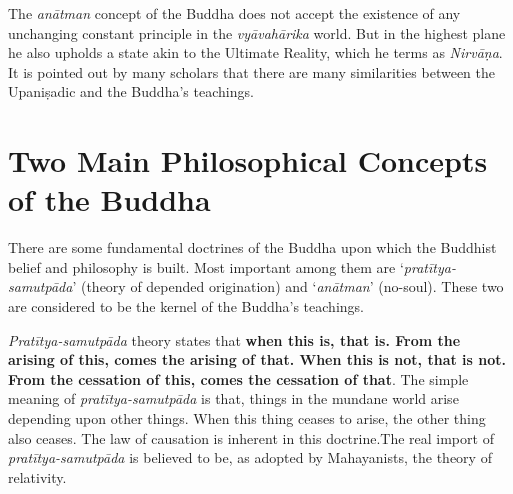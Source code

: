 The \textit{anātman} concept of the Buddha does not accept the existence of any unchanging constant principle in the \textit{vyāvahārika} world. But in the highest plane he also upholds a state akin to the Ultimate Reality, which he terms as \textit{Nirvāṇa}. It is pointed out by many scholars that there are many similarities between the Upaniṣadic and the Buddha’s teachings.


\section*{Two Main Philosophical Concepts of the Buddha}

There are some fundamental doctrines of the Buddha upon which the Buddhist belief and philosophy is built. Most important among them are ‘\textit{pratītya-samutpāda}’ (theory of depended origination) and ‘\textit{anātman}’ (no-soul). These two are considered to be the kernel of the Buddha’s teachings.

\textit{Pratītya-samutpāda} theory states that \textbf{when this is, that is. From the arising of this, comes the arising of that. When this is not, that is not. From the cessation of this, comes the cessation of that}. The simple meaning of \textit{pratītya-samutpāda} is that, things in the mundane world arise depending upon other things. When this thing ceases to arise, the other thing also ceases. The law of causation is inherent in this doctrine.The real import of \textit{pratītya-samutpāda} is believed to be, as adopted by Mahayanists, the theory of relativity.

